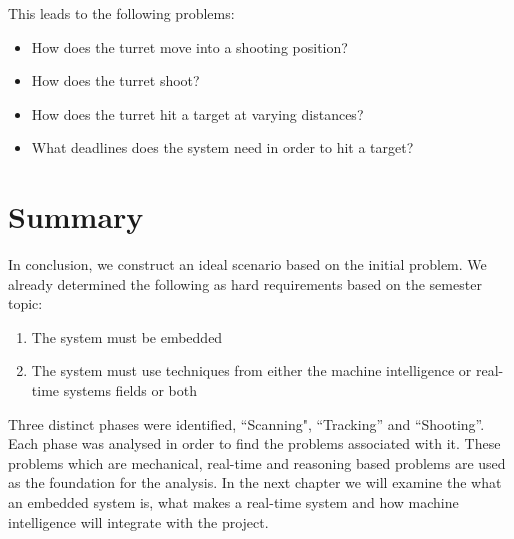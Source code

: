 This leads to the following problems:
\begin{itemize}
  \item How does the turret move into a shooting position?
  \item How does the turret shoot?
  \item How does the turret hit a target at varying distances?
  \item What deadlines does the system need in order to hit a target?
\end{itemize}

\section{Summary}
In conclusion, we construct an ideal scenario based on the initial problem. We
already determined the following as hard requirements based on the semester
topic:

\begin{enumerate}
	\item The system must be embedded
	\item The system must use techniques from either the machine intelligence or
	real-time systems fields or both
\end{enumerate}

Three distinct phases were identified, ``Scanning", ``Tracking'' and
``Shooting''. Each phase was analysed in order to find the problems associated
with it. These problems which are mechanical, real-time and reasoning based
problems are used as the foundation for the analysis. In the next chapter
we will examine the what an embedded system is, what makes a real-time system
and how machine intelligence will integrate with the project.